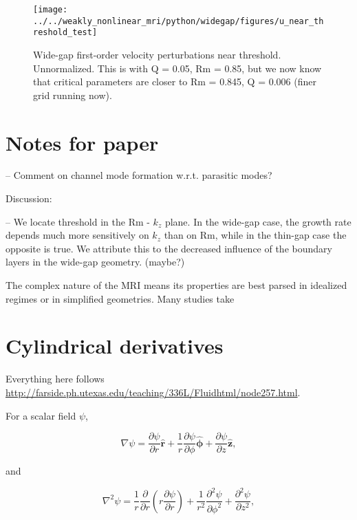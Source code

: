 \documentclass{paper}
\newcommand{\rhat}{\ensuremath{\mathbf{\hat{r}}}}
\newcommand{\phihat}{\ensuremath{\mathbf{\hat{\phi}}}}
\newcommand{\zhat}{\ensuremath{\mathbf{\hat{z}}}}
\newcommand\reym{\mathrm{Rm}}
\begin{document}
\begin{figure}
\centering
\texttt{[image: ../../weakly\_nonlinear\_mri/python/widegap/figures/u\_near\_threshold\_test]}
\caption{Wide-gap first-order velocity perturbations near threshold. Unnormalized. This is with Q = 0.05, Rm = 0.85, but we now know that critical parameters are closer to Rm = 0.845, Q = 0.006 (finer grid running now).
\label{fig:firstorder_u}}
\end{figure}

\section{Notes for paper}

-- Comment on channel mode formation w.r.t. parasitic modes?

Discussion:

-- We locate threshold in the $\reym$ - $k_z$ plane. In the wide-gap case, the growth rate depends much more sensitively on $k_z$ than on $\reym$, while in the thin-gap case the opposite is true. We attribute this to the decreased influence of the boundary layers in the wide-gap geometry. (maybe?)

The complex nature of the MRI means its properties are best parsed in idealized regimes or in simplified geometries. Many studies take 


\appendix

\section{Cylindrical derivatives}
\label{sec:cylindrical_deriv}

Everything here follows \url{http://farside.ph.utexas.edu/teaching/336L/Fluidhtml/node257.html}.

For a scalar field $\psi$, 

\begin{equation}
  \label{eq:del_scalar}
  \nabla \psi = \frac{\partial \psi}{\partial r} \rhat + \frac{1}{r} \frac{\partial \psi}{\partial \phi} \phihat + \frac{\partial \psi}{\partial z} \zhat,
\end{equation}

and

\begin{equation}
  \label{eq:del2_scalar}
  \nabla^2 \psi = \frac{1}{r} \frac{\partial}{\partial r}\left(r \frac{\partial \psi}{\partial r} \right) + \frac{1}{r^2} \frac{\partial^2 \psi}{\partial \phi^2} + \frac{\partial^2 \psi}{\partial z^2},
\end{equation}
\end{document}
